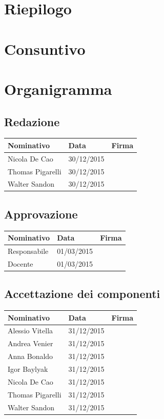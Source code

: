 \documentclass[12pt,a4paper]{article}
\begin{document}
\section{Riepilogo}

\newpage

\section{Consuntivo}

\newpage

\appendix
\section{Organigramma}

\subsection{Redazione}

\begin{tabular}{| l | l | l |}
    \hline
    Nominativo & Data & Firma \\ \hline
    Nicola De Cao & 30/12/2015 & \\ \hline
    Thomas Pigarelli & 30/12/2015 & \\ \hline
    Walter Sandon & 30/12/2015 & \\ \hline
\end{tabular}


\subsection{Approvazione}

\begin{tabular}{| l | l | l |}
    \hline
    Nominativo & Data & Firma \\ \hline
    Responsabile & 01/03/2015 & \\ \hline
    Docente & 01/03/2015 & \\ \hline
\end{tabular}

\subsection{Accettazione dei componenti}

\begin{tabular}{| l | l | l |}
    \hline
    Nominativo & Data & Firma \\ \hline
    Alessio Vitella & 31/12/2015 & \\ \hline
    Andrea Venier & 31/12/2015 & \\ \hline
    Anna Bonaldo & 31/12/2015 & \\ \hline
    Igor Baylyak & 31/12/2015 & \\ \hline
    Nicola De Cao & 31/12/2015 & \\ \hline
    Thomas Pigarelli & 31/12/2015 & \\ \hline
    Walter Sandon & 31/12/2015 & \\ \hline
\end{tabular}
\end{document}
